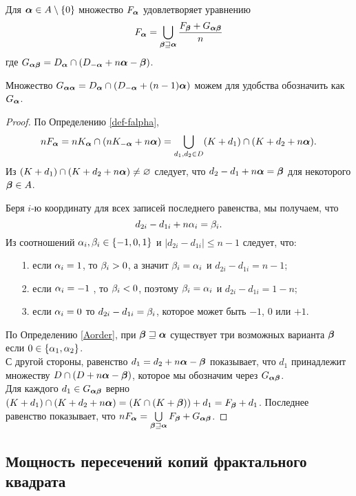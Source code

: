 \begin{theorem}\label{thm:falpha}
Для ${\bm{\alpha}}\in A\setminus\{0\}$ множество $F_{\bm{\alpha}}$ удовлетворяет уравнению
\begin{equation}\label{sideint}
 F_{\bm{\alpha}}=\bigcup\limits_{{\bm{\beta}}\sqsupseteq{\bm{\alpha}}} \dfrac{F_{\bm{\beta}}+G_{{\bm{\alpha}}{\bm{\beta}}}}{n}
 \end{equation}
где 
$G_{{\bm{\alpha}}{\bm{\beta}}}=D_{\bm{\alpha}}\cap(D_{-{\bm{\alpha}}}+n{\bm{\alpha}}-{\bm{\beta}})$.
\end{theorem}

Множество $G_{{\bm{\alpha}}{\bm{\alpha}}}=D_{\bm{\alpha}}\cap(D_{-{\bm{\alpha}}}+(n-1){\bm{\alpha}})$ можем для удобства обозначить как $G_{{\bm{\alpha}}}$.

\begin{proof}
По Определению \ref{def-falpha},
\begin{equation}\label{line}
 nF_{\bm{\alpha}}=nK_{\bm{\alpha}} \cap (nK_{-{\bm{\alpha}}}+n{\bm{\alpha}})= 
 \bigcup\limits_{d_1,d_2\in D}(K+d_1)\cap (K+d_2+n{\bm{\alpha}}).
 \end{equation}
Из $(K+d_1)\cap (K+d_2+n{\bm{\alpha}})\neq\varnothing$ следует, что $d_2-d_1+n{\bm{\alpha}}={\bm{\beta}}$ для некоторого ${\bm{\beta}}\in A$.

Беря $i$-ю координату для всех записей последнего равенства, мы получаем, что
$$d_{2i}-d_{1i}+n\alpha_i=\beta_i.$$ 
Из соотношений $\alpha_i,\beta_i\in\{-1,0,1\}$ и $|d_{2i}-d_{1i}|\le n-1$ следует, что:\\ 
\begin{itemize}[nolistsep]
 \item[1.] если $\alpha_i=1$, то $\beta_i>0$, а значит $\beta_i=\alpha_i$ и $d_{2i}-d_{1i}=n-1$;
 \item[2.] если $\alpha_i=-1$ , то $\beta_i<0$, поэтому $\beta_i=\alpha_i$ и $d_{2i}-d_{1i}=1-n$;
 \item[3.] если $\alpha_i=0$ то $d_{2i}-d_{1i}=\beta_i$, которое может быть $-1$, $0$ или $+1$.
\end{itemize}

По Определению \ref{Aorder}, при ${\bm{\beta}}\sqsupseteq{\bm{\alpha}}$ существует три возможных варианта ${\bm{\beta}}$ если $0\in\{\alpha_1,\alpha_2\}$.\\
С другой стороны, равенство $d_1=d_2+n{\bm{\alpha}}-{\bm{\beta}}$ показывает, что $d_1$ принадлежит множеству $D\cap(D+n{\bm{\alpha}}-{\bm{\beta}})$, которое мы обозначим через $G_{{\bm{\alpha}}{\bm{\beta}}}$.\\
Для каждого $d_1\in G_{{\bm{\alpha}}{\bm{\beta}}}$ верно $(K+d_1)\cap (K+d_2+n{\bm{\alpha}})= (K\cap(K+{\bm{\beta}}))+d_1= F_{\bm{\beta}}+d_1$.
Последнее равенство показывает, что $nF_{\bm{\alpha}}= \bigcup\limits_{{\bm{\beta}}\sqsupseteq{\bm{\alpha}}} {F_{\bm{\beta}}+G_{{\bm{\alpha}}{\bm{\beta}}}}$.
\end{proof}


\subsection{Мощность пересечений копий фрактального квадрата}

